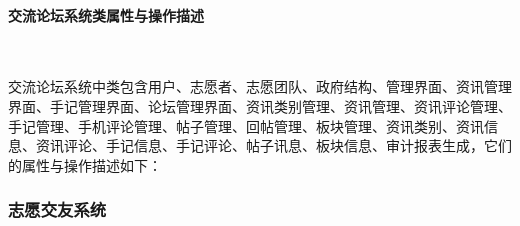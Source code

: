\paragraph{交流论坛系统类属性与操作描述}~{}

交流论坛系统中类包含用户、志愿者、志愿团队、政府结构、管理界面、资讯管理界面、手记管理界面、论坛管理界面、资讯类别管理、资讯管理、资讯评论管理、手记管理、手机评论管理、帖子管理、回帖管理、板块管理、资讯类别、资讯信息、资讯评论、手记信息、手记评论、帖子讯息、板块信息、审计报表生成，它们的属性与操作描述如下：




\subsubsection{志愿交友系统}

